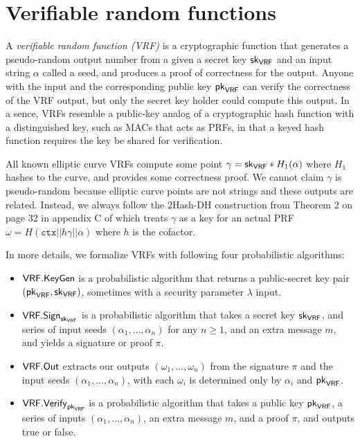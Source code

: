 \section{Verifiable random functions}
\label{sec:VRFs}


A {\em verifiable random function (VRF)} is a cryptographic function that generates a pseudo-random output number from a given a secret key $\mathsf{sk}_{\mathsf{VRF}}$ and an input string $\alpha$ called a seed, and produces a proof of correctness for the output.  Anyone with the input and the corresponding public key $\mathsf{pk}_{\mathsf{VRF}}$ can verify the correctness of the VRF output, but only the secret key holder could compute this output.  In a sence, VRFs resemble a public-key analog of a cryptographic hash function with a distinguished key, such as MACs that acts as PRFs, in that a keyed hash function requires the key be shared for verification. 

All known elliptic curve VRFs compute some point $\gamma = \mathsf{sk}_{\mathsf{VRF}} * H_1(\alpha)$ where $H_1$ hashes to the curve, and provides some correctness proof.  We cannot claim $\gamma$ is pseudo-random because elliptic curve points are not strings and these outputs are related.  Instead, we always follow the 2Hash-DH construction from Theorem 2 on page 32 in appendix C of \cite{Praos} which treats $\gamma$ as a key for an actual PRF $\omega = H(\mathtt{ctx} || h \gamma || \alpha)$ where $h$ is the cofactor.  

In more details, we formalize VRFs with following four probabilistic algorithms: 
\begin{itemize}
\item $\mathsf{VRF}.\mathsf{KeyGen}$ is a probabilistic algorithm that returns a public-secret key pair $(\mathsf{pk}_{\mathsf{VRF}},\mathsf{sk}_{\mathsf{VRF}})$, sometimes with a security parameter $\lambda$ input.
\item $\mathsf{VRF}.\mathsf{Sign}_{\mathsf{sk}_{\mathsf{VRF}}}$ is a probabilistic algorithm that takes a secret key $\mathsf{sk}_{\mathsf{VRF}}$, and series of input seeds $(\alpha_1,\ldots,\alpha_n)$ for any $n\ge1$, and an extra message $m$, and yields a signature or proof $\pi$. 
\item $\mathsf{VRF}.\mathsf{Out}$ extracts our outputs $(\omega_1,\ldots,\omega_n)$ from the signature $\pi$ and the input seeds $(\alpha_1,\ldots,\alpha_n)$, with each $\omega_i$ is determined only by $\alpha_i$ and $\mathsf{pk}_{\mathsf{VRF}}$.
\item $\mathsf{VRF}.\mathsf{Verify}_{\mathsf{pk}_{\mathsf{VRF}}}$ is a probabilistic algorithm that takes a public key $\mathsf{pk}_{\mathsf{VRF}}$, a series of inputs $(\alpha_1,\ldots,\alpha_n)$, an extra message $m$, and a proof $\pi$, and outputs true or false.
\end{itemize}

